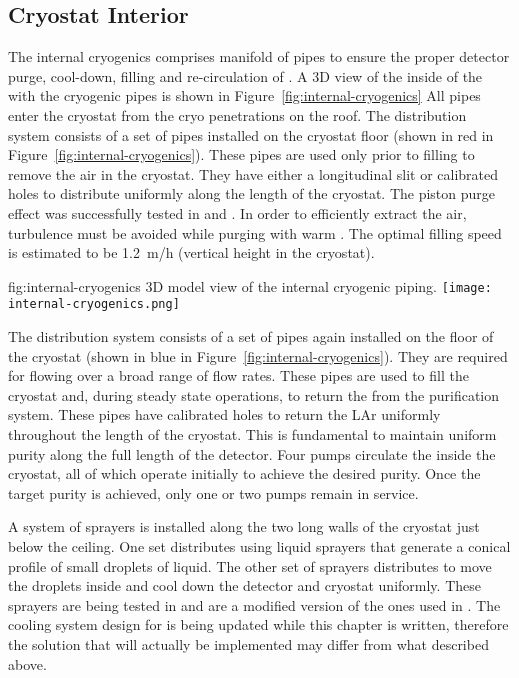 \subsection{Cryostat Interior}
The internal cryogenics comprises manifold of pipes to ensure the proper detector purge, cool-down, filling and re-circulation of .
A 3D view of the inside of the  with the cryogenic pipes is shown in Figure~\ref{fig:internal-cryogenics}
All pipes enter the cryostat from the cryo penetrations on the roof.
The  distribution system consists of a set of pipes installed on the cryostat floor (shown in red in Figure~\ref{fig:internal-cryogenics}).
These pipes are used only prior to filling to remove the air in the cryostat.
They have either a longitudinal slit or calibrated holes to distribute  uniformly along the length of the cryostat.
The piston purge effect was successfully tested in  and  .
In order to efficiently extract the air, turbulence must be avoided while purging with warm .
The optimal filling speed is estimated to be 1.2~m/h (vertical height in the cryostat).
\begin{dunefigure}{fig:internal-cryogenics}
{3D model view of the internal cryogenic piping.}
\texttt{[image: internal-cryogenics.png]}
\end{dunefigure}

The  distribution system consists of a set of pipes again installed on the floor of the cryostat (shown in blue in Figure~\ref{fig:internal-cryogenics}).
They are required for flowing  over a broad range of flow rates.
These pipes are used to fill the cryostat and, during steady state operations, to return the  from the purification system.
These pipes have calibrated holes to return the LAr uniformly throughout the length of the cryostat.
This is fundamental to maintain uniform purity along the full length of the detector.
Four pumps circulate the  inside the cryostat, all of which operate initially to achieve the desired purity.
Once the target purity is achieved, only one or two pumps remain in service.

A system of \cooldown sprayers is installed along the two long walls of the cryostat just below the ceiling.
One set distributes  using liquid sprayers that generate a conical profile of small droplets of liquid.
The other set of sprayers distributes  to move the  droplets inside and cool down the detector and cryostat uniformly.
These sprayers are being tested in  and are a modified version of the ones used in .
The cooling system design for  is being updated while this chapter is written, therefore the solution that will actually be implemented may differ from what described above.


